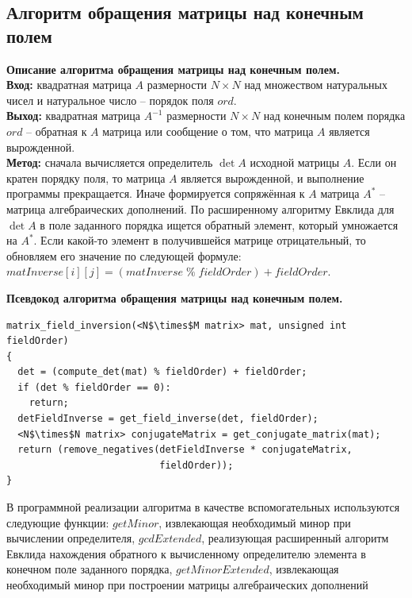 \documentclass[spec, och, otchet, hidelinks]{SCWorks}
\newcommand{\tbf}[1]{\textbf{#1}}
\begin{document}
\subsection{Алгоритм обращения матрицы над конечным полем}
\par \tbf{Описание алгоритма обращения матрицы над конечным полем.} \\
\tbf{Вход:} квадратная матрица $A$ размерности $N \times N$ над множеством
натуральных чисел и натуральное число -- порядок поля $ord$. \\
\tbf{Выход:} квадратная матрица $A^{-1}$ размерности $N \times N$ над конечным
полем порядка $ord$ -- обратная к $A$ матрица или сообщение о том, что матрица
$A$ является вырожденной. \\
\tbf{Метод:} сначала вычисляется определитель $\det A$ исходной матрицы $A$.
Если он кратен порядку поля, то матрица $A$ является вырожденной, и выполнение
программы прекращается. Иначе формируется сопряжённая к $A$ матрица $A^{*}$ --
матрица алгебраических дополнений. По расширенному алгоритму Евклида для $\det
A$ в поле заданного порядка ищется обратный элемент, который умножается на
$A^{*}$. Если какой-то элемент в получившейся матрице отрицательный, то
обновляем его значение по следующей формуле: $matInverse[i][j] = (matInverse \;
\% \; fieldOrder) + fieldOrder$.

\par \tbf{Псевдокод алгоритма обращения матрицы над конечным полем.}
\begin{lstlisting}[caption=Псевдокод алгоритма., mathescape]
matrix_field_inversion(<N$\times$M matrix> mat, unsigned int fieldOrder)
{
  det = (compute_det(mat) % fieldOrder) + fieldOrder;
  if (det % fieldOrder == 0):
    return;
  detFieldInverse = get_field_inverse(det, fieldOrder);
  <N$\times$N matrix> conjugateMatrix = get_conjugate_matrix(mat);
  return (remove_negatives(detFieldInverse * conjugateMatrix, 
                           fieldOrder));
}
\end{lstlisting}

\par В программной реализации алгоритма в качестве вспомогательных используются
следующие функции: $getMinor$, извлекающая необходимый минор при вычислении
определителя, $gcdExtended$, реализующая расширенный алгоритм Евклида нахождения обратного к
вычисленному определителю элемента в конечном поле заданного порядка,
$getMinorExtended$, извлекающая необходимый минор при построении матрицы
алгебраических дополнений 

\newpage
\end{document}
